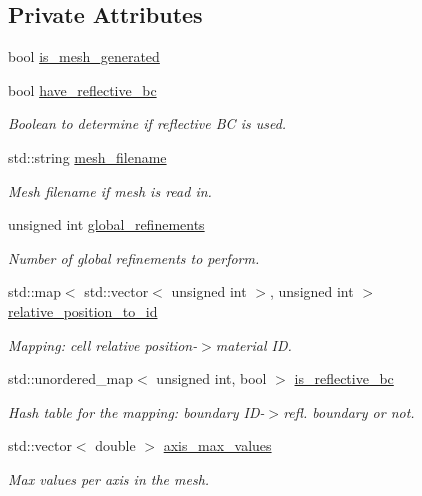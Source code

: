 \subsection*{Private Attributes}
\begin{DoxyCompactItemize}
\item 
bool \hyperlink{class_mesh_generator_ad2e8abde741e4c291741cf4ee790e0e2}{is\+\_\+mesh\+\_\+generated}
\item 
bool \hyperlink{class_mesh_generator_a7d6e17f844b8026a062b93ae12b1ee40}{have\+\_\+reflective\+\_\+bc}
\begin{DoxyCompactList}\small\item\em Boolean to determine if reflective BC is used. \end{DoxyCompactList}\item 
std\+::string \hyperlink{class_mesh_generator_a1b283d2ba59b1719cab8dd191e72508a}{mesh\+\_\+filename}
\begin{DoxyCompactList}\small\item\em Mesh filename if mesh is read in. \end{DoxyCompactList}\item 
unsigned int \hyperlink{class_mesh_generator_af8fc6b25c91228ca1ccce7f1c7a2a526}{global\+\_\+refinements}
\begin{DoxyCompactList}\small\item\em Number of global refinements to perform. \end{DoxyCompactList}\item 
std\+::map$<$ std\+::vector$<$ unsigned int $>$, unsigned int $>$ \hyperlink{class_mesh_generator_a4d3e0a3f830a2fa4d35d7f269fba3b02}{relative\+\_\+position\+\_\+to\+\_\+id}
\begin{DoxyCompactList}\small\item\em Mapping\+: cell relative position-\/$>$material ID. \end{DoxyCompactList}\item 
std\+::unordered\+\_\+map$<$ unsigned int, bool $>$ \hyperlink{class_mesh_generator_a5a6820b74d7cef07596e1d28a8bad8aa}{is\+\_\+reflective\+\_\+bc}
\begin{DoxyCompactList}\small\item\em Hash table for the mapping\+: boundary I\+D-\/$>$refl. boundary or not. \end{DoxyCompactList}\item 
std\+::vector$<$ double $>$ \hyperlink{class_mesh_generator_ab65cdce3616c05ca7b02f88a63c7a403}{axis\+\_\+max\+\_\+values}
\begin{DoxyCompactList}\small\item\em Max values per axis in the mesh. \end{DoxyCompactList}\item 

\end{DoxyCompactItemize}
